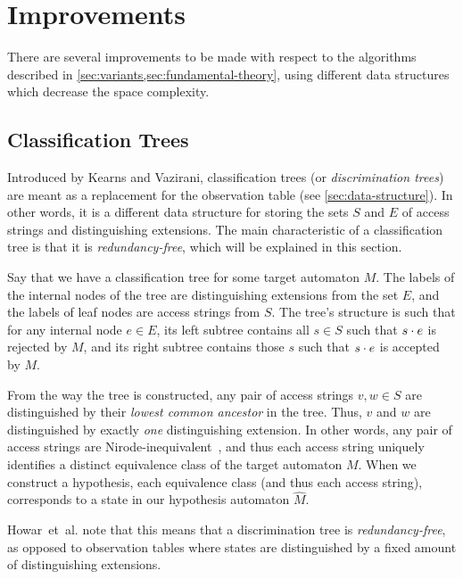 \documentclass[multi,crop=false,class=article]{standalone}
\begin{document}
\section{Improvements}
\label{sec:improvements}
There are several improvements to be made with respect to the algorithms
described in \cref{sec:variants,sec:fundamental-theory}, using different data
structures which decrease the space complexity.

\subsection{Classification Trees}
\label{sec:classification-trees}
Introduced by Kearns and Vazirani\cite{Kearns94}, classification trees (or
\textit{discrimination trees}) are meant as a replacement for the observation
table (see \cref{sec:data-structure}). In other words, it is a different data
structure for storing the sets $S$ and $E$ of access strings and distinguishing
extensions. The main characteristic of a classification tree is that it is
\textit{redundancy-free}, which will be explained in this section.

Say that we have a classification tree for some target automaton $M$. The labels
of the internal nodes of the tree are distinguishing extensions from the set
$E$, and the labels of leaf nodes are access strings from $S$. The tree's
structure is such that for any internal node $e \in E$, its left subtree
contains all $s \in S$ such that $s \cdot e$ is rejected by $M$, and its right
subtree contains those $s$ such that $s \cdot e$ is accepted by $M$.

From the way the tree is constructed, any pair of access strings $v,w \in S$ are
distinguished by their \textit{lowest common ancestor} in the tree. Thus, $v$
and $w$ are distinguished by exactly \textit{one} distinguishing extension. In
other words, any pair of access strings are Nirode-inequivalent~, and thus each access string uniquely identifies a distinct
equivalence class of the target automaton $M$. When we construct a hypothesis,
each equivalence class (and thus each access string), corresponds to a state in
our hypothesis automaton $\hat M$.

Howar~et~al. note that this means that a discrimination tree is
\textit{redundancy-free}, as opposed to observation tables where states are
distinguished by a fixed amount of distinguishing extensions\cite{Howar14}.
\end{document}
